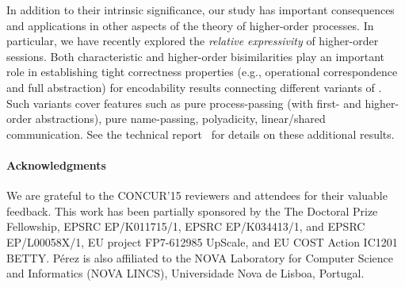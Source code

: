 In addition to their intrinsic significance, our study 
has important consequences and applications in other aspects of the theory of higher-order   processes. 
In particular,  we have recently explored the \emph{relative expressivity}
of higher-order sessions.  
 Both characteristic and higher-order bisimilarities play an important role in establishing 
 tight correctness properties (e.g., operational correspondence and full abstraction) for encodability results connecting different variants of \HOp.
 Such variants cover
 features such as 
 pure process-passing (with first- and higher-order abstractions), pure name-passing, polyadicity, linear/shared communication. 
 See the  
technical report~\cite{KouzapasPY15} for details on these additional results.

\paragraph{Acknowledgments} 
We are grateful to the CONCUR'15 reviewers and attendees for their valuable feedback.
This work has been partially sponsored by the The Doctoral Prize Fellowship, EPSRC EP/K011715/1, EPSRC EP/K034413/1, and EPSRC EP/L00058X/1, EU project FP7-612985 UpScale, and EU COST Action IC1201 BETTY. P\'{e}rez is also affiliated to the NOVA Laboratory for Computer Science and Informatics (NOVA LINCS), Universidade Nova de Lisboa, Portugal.